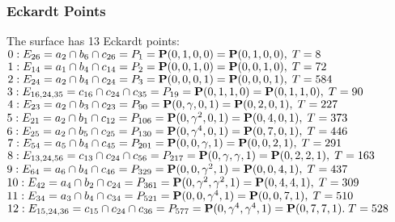 \documentclass{article}
\newcommand{\bP}{{\bf P}}
\begin{document}
{\subsubsection*{Eckardt Points}
The surface has 13 Eckardt points:\\
$0 : E_{26}=a_{2} \cap b_{6} \cap c_{26} = P_{1}=\bP(0, 1, 0, 0) = \bP(0, 1, 0, 0),\; T= 8$\\
$1 : E_{14}=a_{1} \cap b_{4} \cap c_{14} = P_{2}=\bP(0, 0, 1, 0) = \bP(0, 0, 1, 0),\; T= 72$\\
$2 : E_{24}=a_{2} \cap b_{4} \cap c_{24} = P_{3}=\bP(0, 0, 0, 1) = \bP(0, 0, 0, 1),\; T= 584$\\
$3 : E_{16,24,35}=c_{16} \cap c_{24} \cap c_{35} = P_{19}=\bP(0, 1, 1, 0) = \bP(0, 1, 1, 0),\; T= 90$\\
$4 : E_{23}=a_{2} \cap b_{3} \cap c_{23} = P_{90}=\bP(0, \gamma , 0, 1) = \bP(0, 2, 0, 1),\; T= 227$\\
$5 : E_{21}=a_{2} \cap b_{1} \cap c_{12} = P_{106}=\bP(0, \gamma^{2}, 0, 1) = \bP(0, 4, 0, 1),\; T= 373$\\
$6 : E_{25}=a_{2} \cap b_{5} \cap c_{25} = P_{130}=\bP(0, \gamma^{4}, 0, 1) = \bP(0, 7, 0, 1),\; T= 446$\\
$7 : E_{54}=a_{5} \cap b_{4} \cap c_{45} = P_{201}=\bP(0, 0, \gamma , 1) = \bP(0, 0, 2, 1),\; T= 291$\\
$8 : E_{13,24,56}=c_{13} \cap c_{24} \cap c_{56} = P_{217}=\bP(0, \gamma , \gamma , 1) = \bP(0, 2, 2, 1),\; T= 163$\\
$9 : E_{64}=a_{6} \cap b_{4} \cap c_{46} = P_{329}=\bP(0, 0, \gamma^{2}, 1) = \bP(0, 0, 4, 1),\; T= 437$\\
$10 : E_{42}=a_{4} \cap b_{2} \cap c_{24} = P_{361}=\bP(0, \gamma^{2}, \gamma^{2}, 1) = \bP(0, 4, 4, 1),\; T= 309$\\
$11 : E_{34}=a_{3} \cap b_{4} \cap c_{34} = P_{521}=\bP(0, 0, \gamma^{4}, 1) = \bP(0, 0, 7, 1),\; T= 510$\\
$12 : E_{15,24,36}=c_{15} \cap c_{24} \cap c_{36} = P_{577}=\bP(0, \gamma^{4}, \gamma^{4}, 1) = \bP(0, 7, 7, 1).\; T= 528$\\
}
\end{document}
